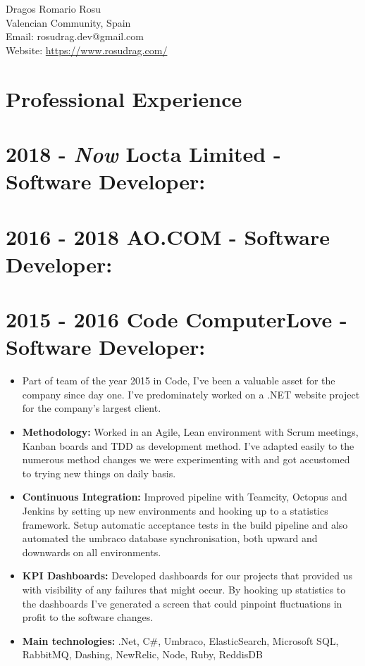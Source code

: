 \documentclass[12pt,a4paper]{res}
\begin{document}
\thispagestyle{empty}
  \begin{center}
  \Large{Dragos Romario Rosu  \\ [12pt]}
  \normalsize Valencian Community, Spain\\
  Email: rosudrag.dev@gmail.com\\
  Website: \url{https://www.rosudrag.com/}
  \end{center}
  
\begin{resume}
\vspace{-10mm}
\section{\large\bf Professional Experience}

\section{\bf 2018 - \textit{Now} \hspace{0.6mm} Locta Limited - Software Developer:}
\section{\bf 2016 - 2018 \hspace{0.3mm} AO.COM - Software Developer:}
\section{\bf 2015 - 2016 \hspace{0.3mm} Code ComputerLove - Software Developer:}
\vspace{5mm}    
	\begin{itemize}
	\item[] Part of team of the year 2015 in Code, I've been a valuable asset for the company since day one. I've predominately worked on a .NET website project for the company's largest client.
	\item \textbf{Methodology:} Worked in an Agile, Lean environment with Scrum meetings, Kanban boards and TDD as development method. I've adapted easily to the numerous method changes we were experimenting with and got accustomed to trying new things on daily basis.
	\item \textbf{Continuous Integration:} Improved pipeline with Teamcity, Octopus and Jenkins by setting up new environments and hooking up to a statistics framework. Setup automatic acceptance tests in the build pipeline and also automated the umbraco database synchronisation, both upward and downwards on all environments.
	\item \textbf{KPI Dashboards:} Developed dashboards for our projects that provided us with visibility of any failures that might occur. By hooking up statistics to the dashboards I've generated a screen that could pinpoint fluctuations in profit to the software changes.
	\item \textbf{Main technologies:} .Net, C\#, Umbraco, ElasticSearch, Microsoft SQL, RabbitMQ, Dashing, NewRelic, Node, Ruby, ReddisDB
	\end{itemize}
	

\end{resume}
\end{document}
